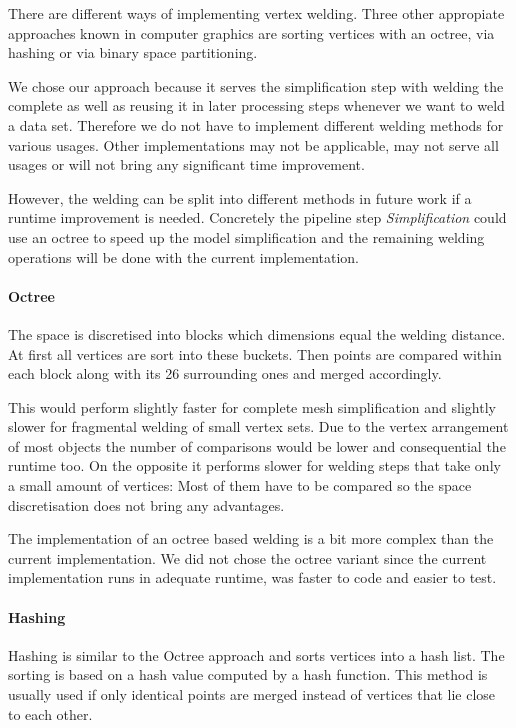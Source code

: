 \documentclass[../ClassicThesis.tex]{subfiles}
\begin{document}
There are different ways of implementing vertex welding. Three other appropiate approaches known in computer graphics are sorting vertices with an octree, via hashing or via binary space partitioning.

We chose our approach because it serves the simplification step with welding the complete {\threedmodel} as well as reusing it in later processing steps whenever we want to weld a data set. Therefore we do not have to implement different welding methods for various usages. Other implementations may not be applicable, may not serve all usages or will not bring any significant time improvement.

However, the welding can be split into different methods in future work if a runtime improvement is needed. Concretely the pipeline step \emph{Simplification} could use an octree to speed up the model simplification and the remaining welding operations will be done with the current implementation.

\paragraph{Octree}

The space is discretised into blocks which dimensions equal the welding distance. At first all vertices are sort into these buckets. Then points are compared within each block along with its 26 surrounding ones and merged accordingly.

This would perform slightly faster for complete mesh simplification and slightly slower for fragmental welding of small vertex sets. Due to the vertex arrangement of most objects the number of comparisons would be lower and consequential the runtime too. On the opposite it performs slower for welding steps that take only a small amount of vertices: Most of them have to be compared so the space discretisation does not bring any advantages.

The implementation of an octree based welding is a bit more complex than the current implementation. We did not chose the octree variant since the current implementation runs in adequate runtime, was faster to code and easier to test.

\paragraph{Hashing}

Hashing is similar to the Octree approach and sorts vertices into a hash list. The sorting is based on a hash value computed by a hash function. This method is usually used if only identical points are merged instead of vertices that lie close to each other.
\end{document}
